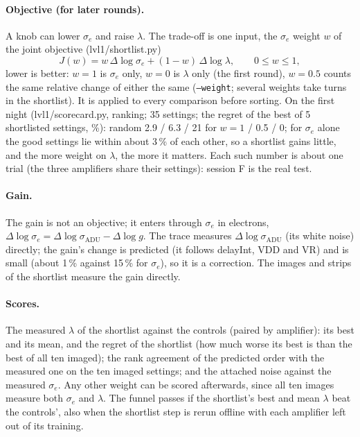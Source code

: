 \documentclass[11pt]{article}
\begin{document}
\paragraph{Objective (for later rounds).} A knob can lower $\sigma_e$ and raise $\lambda$. The trade-off is one input, the
$\sigma_e$ weight $w$ of the joint objective (lvl1/shortlist.py)
\begin{equation}
J(w)=w\,\Delta\log\sigma_e+(1-w)\,\Delta\log\lambda,\qquad 0\le w\le1,
\end{equation}
lower is better: $w=1$ is $\sigma_e$ only, $w=0$ is $\lambda$ only (the first round), $w=0.5$ counts the same relative
change of either the same (\texttt{--weight}; several weights take turns in the shortlist). It is applied to every
comparison before sorting. On the first night (lvl1/scorecard.py, ranking; 35 settings; the regret of the best of 5
shortlisted settings, \%): random 2.9 / 6.3 / 21 for $w=1$ / 0.5 / 0; for $\sigma_e$ alone the good settings lie within
about 3\,\% of each other, so a shortlist gains little, and the more weight on $\lambda$, the more it matters. Each such
number is about one trial (the three amplifiers share their settings): session F is the real test.

\paragraph{Gain.} The gain is not an objective; it enters through $\sigma_e$ in electrons,
$\Delta\log\sigma_e=\Delta\log\sigma_{\mathrm{ADU}}-\Delta\log g$. The trace measures $\Delta\log\sigma_{\mathrm{ADU}}$
(its white noise) directly; the gain's change is predicted (it follows delayInt, VDD and VR) and is small (about 1\,\%
against 15\,\% for $\sigma_e$), so it is a correction. The images and strips of the shortlist measure the gain directly.
\paragraph{Scores.} The measured $\lambda$ of the shortlist against the controls (paired by amplifier): its best and its
mean, and the regret of the shortlist (how much worse its best is than the best of all ten imaged); the rank agreement
of the predicted order with the measured one on the ten imaged settings; and the attached noise against the measured
$\sigma_e$. Any other weight can be scored afterwards, since all ten images measure both $\sigma_e$ and $\lambda$. The
funnel passes if the shortlist's best and mean $\lambda$ beat the controls', also when the shortlist step is rerun
offline with each amplifier left out of its training.
\end{document}
